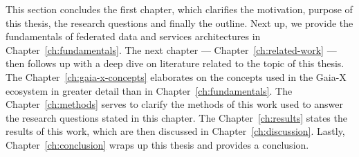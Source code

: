 This section concludes the first chapter, which clarifies the motivation, purpose of this thesis, the research questions and finally the outline.
Next up, we provide the fundamentals of federated data and services architectures in Chapter~\ref{ch:fundamentals}.
The next chapter --- Chapter~\ref{ch:related-work} --- then follows up with a deep dive on literature related to the topic of this thesis.
The Chapter~\ref{ch:gaia-x-concepts} elaborates on the concepts used in the Gaia-X ecosystem in greater detail than in Chapter~\ref{ch:fundamentals}.
The Chapter~\ref{ch:methods} serves to clarify the methods of this work used to answer the research questions stated in this chapter.
The Chapter~\ref{ch:results} states the results of this work, which are then discussed in Chapter~\ref{ch:discussion}.
Lastly, Chapter~\ref{ch:conclusion} wraps up this thesis and provides a conclusion.
